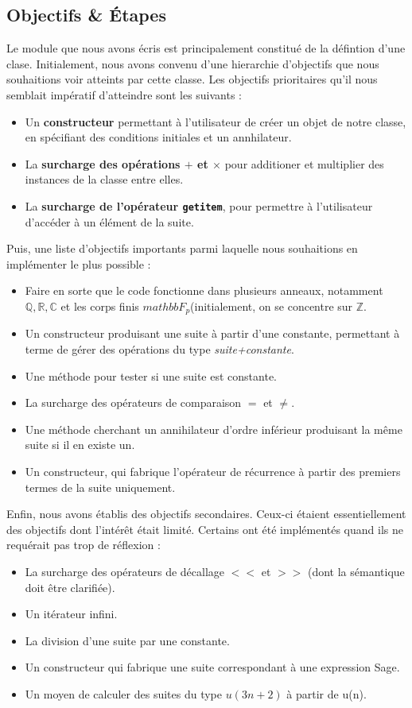 \documentclass[12pt]{article}
\newlength{\charwidth}
\newcommand{\uline}{\underline{\hspace{2\charwidth}}}
\let\olditem\item
\renewcommand{\item}{\olditem[$\bullet$]}
\newcommand{\itemV}{\olditem[{\color{green} \ding{51}}]}
\newcommand{\itemX}{\olditem[{\color{red} \ding{55}}]}
\begin{document}
    \subsection{Objectifs \& Étapes}
        Le module que nous avons écris est principalement constitué de la défintion
        d'une clase.
        Initialement, nous avons convenu d'une hierarchie d'objectifs que nous souhaitions 
        voir atteints par cette classe.
        Les objectifs prioritaires qu'il nous semblait impératif d'atteindre sont les
        suivants :
        \begin{itemize}
            \itemV Un \textbf{constructeur} permettant à l'utilisateur de créer un objet de notre classe,
                en spécifiant des conditions initiales et un annhilateur.
            \itemV La \textbf{surcharge des opérations $+$ et $\times$} pour additioner et multiplier des
                instances de la classe entre elles.
            \itemV La \textbf{surcharge de l'opérateur \texttt{\uline getitem\uline}}, pour permettre à
                l'utilisateur d'accéder à un élément de la suite.
        \end{itemize}
        Puis, une liste d'objectifs importants parmi laquelle nous souhaitions en implémenter le plus
        possible :
        \begin{itemize}
            \itemX Faire en sorte que le code fonctionne dans plusieurs anneaux, notamment
                $\mathbb{Q,R,C}$ et les corps finis $mathbb F_p$(initialement, on se 
                concentre sur $\mathbb Z$.
            \itemV Un constructeur produisant une suite à partir d'une constante, permettant à terme
                de gérer des opérations du type \emph{suite+constante}.
            \itemX Une méthode pour tester si une suite est constante.
            \itemX La surcharge des opérateurs de comparaison $=$ et $\ne$.
            \itemX Une méthode cherchant un annihilateur d'ordre inférieur produisant la même suite
                si il en existe un.
            \itemX Un constructeur, qui fabrique l'opérateur de récurrence à partir des 
                premiers termes de la suite uniquement.
        \end{itemize}

        Enfin, nous avons établis des objectifs secondaires. Ceux-ci étaient essentiellement
        des objectifs dont l'intérêt était limité. Certains ont été implémentés quand ils
        ne requérait pas trop de réflexion : 
        \begin{itemize}
            \itemX La surcharge des opérateurs de décallage $<<$ et $>>$ (dont la sémantique doit
                être clarifiée).
            \itemV Un itérateur infini.
            \itemX La division d'une suite par une constante.
            \itemX Un constructeur qui fabrique une suite correspondant à une expression Sage.
            \itemX Un moyen de calculer des suites du type $u(3n+2)$ à partir de u(n).
        \end{itemize}
\end{document}
